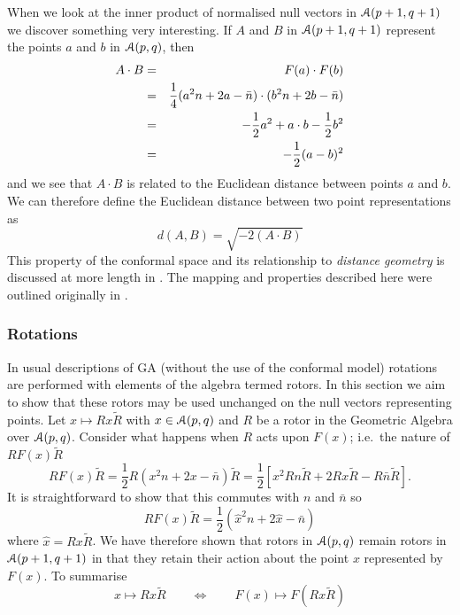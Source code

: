 When we look at the inner product of normalised null vectors in
${\mathcal{A}}(p+1,q+1)$ we discover something very
interesting. If $A$ and $B$ in ${\mathcal{A}}(p+1,q+1)$
represent the points $a$ and $b$ in ${\mathcal{A}}(p,q)$, then
%
\begin{eqnarray} A\cdot B &  =  &  F(a)\cdot F(b) \nonumber \\
            &  =  &  \frac{1}{4}(a^2n + 2a - \bar{n})\cdot (b^2n + 2b -
            \bar{n})\nonumber \\
            & = &    -\frac{1}{2}a^2 + a\cdot b - \frac{1}{2}b^2 \nonumber \\
            &  =  &  -\frac{1}{2}(a-b)^2
\end{eqnarray}
%
and we see that $A\cdot B$ is related to the Euclidean
distance between points $a$ and $b$. 
We can therefore define the Euclidean distance between two
point representations as
\begin{equation}
d(A,B) = \sqrt{-2 (A \cdot B) }
            \label{distance}
\end{equation}
This property of the
conformal space and its relationship to \emph{distance geometry}
\cite{distgeom} is discussed at more length in \cite{oldwine}. 
The mapping and properties described here were outlined
originally in \cite{HS84}.

\subsubsection{Rotations}

In usual descriptions of GA (without the use of the conformal model)
rotations are performed with elements of the algebra termed
rotors. In this section we aim to show that these rotors may be used
unchanged on the null vectors representing points.
Let $x \mapsto Rx\tilde{R}$ with $x\in {\mathcal{A}}(p,q)$ and $R$ be a
rotor in the Geometric Algebra over ${\mathcal{A}}(p,q)$. Consider
what happens when $R$ acts upon $F(x)$; i.e.\ the nature of
$RF(x)\tilde{R}$
%
\[ RF(x)\tilde{R} =\frac{1}{2} R(x^2n + 2x - \bar{n})\tilde{R} =\frac{1}{2}[ x^2Rn\tilde{R}
+ 2Rx\tilde{R} - R\bar{n}\tilde{R}]. \]
%
It is straightforward to show that this
commutes with
$n$ and $\bar{n}$  
so
%
\begin{equation} RF(x)\tilde{R} = \frac{1}{2}(\hat{x}^2n + 2\hat{x} - \bar{n})
	\end{equation}
%
where $\hat{x}=R x \tilde{R}$. We have therefore shown that rotors in
${\mathcal{A}}(p,q)$ remain rotors in ${\mathcal{A}}(p+1,q+1)$ in that they retain
their action about the point $x$ represented by $F(x)$. To summarise
%
\begin{equation} x \mapsto Rx\tilde{R} \qquad \Leftrightarrow \qquad F(x) \mapsto
F(Rx\tilde{R}) \end{equation}
%

